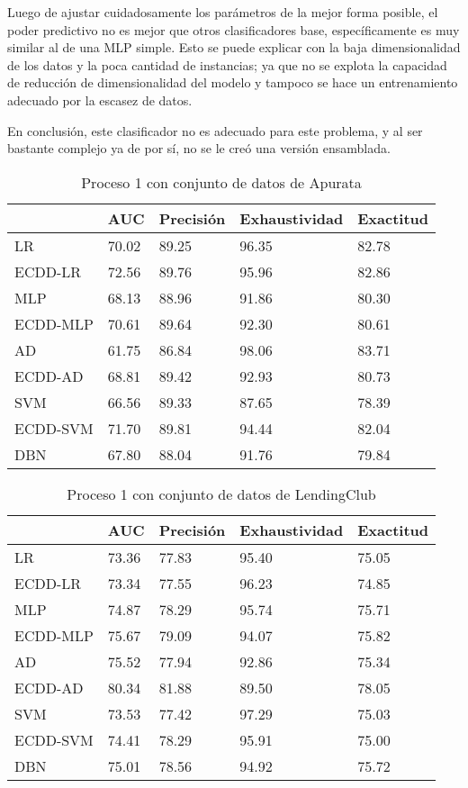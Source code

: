 Luego de ajustar cuidadosamente los parámetros de la mejor forma posible, el poder predictivo no es mejor que otros clasificadores base, específicamente es muy similar al de una \ac{MLP} simple. Esto se puede explicar con la baja dimensionalidad de los datos y la poca cantidad de instancias; ya que no se explota la capacidad de reducción de dimensionalidad del modelo y tampoco se hace un entrenamiento adecuado por la escasez de datos.

En conclusión, este clasificador no es adecuado para este problema, y al ser bastante complejo ya de por sí, no se le creó una versión ensamblada.


\begin{table}[]
\centering
\caption{Proceso 1 con conjunto de datos de Apurata}
\label{tab:apurata-proc1}
\begin{tabularx}{0.75\textwidth}{|l|Y Y Y Y|}
				\hline
				& AUC		& Precisión	& Exhaustividad	& Exactitud	\\
				\hline
LR				& 70.02		& 89.25		& 96.35			& 82.78		\\
ECDD-LR			& 72.56		& 89.76		& 95.96			& 82.86		\\
				\hline
MLP				& 68.13		& 88.96		& 91.86			& 80.30		\\
ECDD-MLP		& 70.61		& 89.64		& 92.30			& 80.61		\\
				\hline
AD				& 61.75		& 86.84		& 98.06			& 83.71		\\
ECDD-AD			& 68.81		& 89.42		& 92.93			& 80.73		\\
				\hline
SVM				& 66.56		& 89.33		& 87.65			& 78.39		\\
ECDD-SVM		& 71.70		& 89.81		& 94.44			& 82.04		\\
				\hline
DBN				& 67.80		& 88.04		& 91.76			& 79.84		\\
				\hline
\end{tabularx}
\end{table}


\begin{table}[]
\centering
\caption{Proceso 1 con conjunto de datos de LendingClub}
\label{tab:lc-proc1}
\begin{tabularx}{0.75\textwidth}{|l|Y Y Y Y|}
				\hline
				& AUC		& Precisión	& Exhaustividad	& Exactitud	\\
				\hline
LR				& 73.36		& 77.83		& 95.40			& 75.05		\\
ECDD-LR			& 73.34		& 77.55		& 96.23			& 74.85		\\
				\hline
MLP				& 74.87		& 78.29		& 95.74			& 75.71		\\
ECDD-MLP		& 75.67		& 79.09		& 94.07			& 75.82		\\
				\hline
AD				& 75.52		& 77.94		& 92.86			& 75.34		\\
ECDD-AD			& 80.34		& 81.88		& 89.50			& 78.05		\\
				\hline
SVM				& 73.53		& 77.42		& 97.29			& 75.03		\\
ECDD-SVM		& 74.41		& 78.29		& 95.91			& 75.00		\\
				\hline
DBN				& 75.01		& 78.56		& 94.92			& 75.72		\\
				\hline
\end{tabularx}
\end{table}


